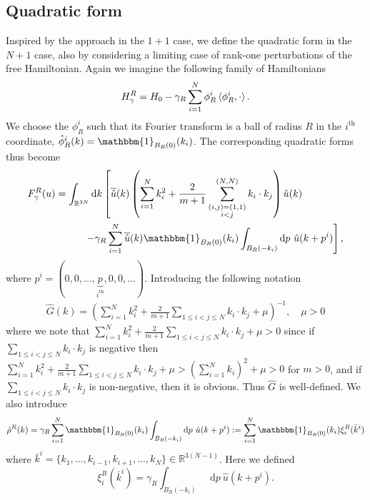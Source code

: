 \documentclass[a4paper,11pt]{article}
\newcommand*\diff{\mathop{}\!\mathrm{d}}
\newcommand{\R}{\mathbb{R}}
\numberwithin{equation}{section}
\begin{document}
\subsection{Quadratic form}
Inspired by the approach in the $ 1+1 $ case, we define the quadratic form in the $ N+1 $ case, also by considering a limiting case of rank-one perturbations of the free Hamiltonian. Again we imagine the following family of Hamiltonians\begin{equation}
H_\gamma^R=H_0-\gamma_R\sum_{i=1}^{N}\phi^i_R\braket{\phi^i_R,\cdot}.
\end{equation}
We choose the $ \phi^i_R $ such that its Fourier transform is a ball of radius $ R $ in the $ i^{\text{th}} $ coordinate, $ \hat{\phi}^i_R(k)=\mathbbm{1}_{B_R(0)}(k_i) $. The corresponding quadratic forms thus become\begin{equation}\label{F at Finite R}
\begin{aligned}
F_\gamma^R(u)=\int_{\R^{3N}}\diff k \left[\overline{\hat{u}}(k)\left(\sum_{i=1}^{N}k_i^2+\frac{2}{m+1}\sum_{\substack{(i,j)=(1,1)\\i<j}}^{(N,N)}k_i\cdot k_j\right)\hat{u}(k)\qquad\qquad\right.\\\left.-\gamma_R\sum_{i=1}^{N}\overline{\hat{u}}(k)\mathbbm{1}_{B_R(0)}(k_i)\int_{B_R(-k_i)}\diff p\ \hat{u}(k+p^i)\right],
\end{aligned}
\end{equation}
where $ p^i=(0,0,...,\underbrace{p}_{i^\text{th}},0,0,...) $. Introducing the following notation\begin{equation}
\begin{aligned}
\hat{G}(k)=\left(\sum_{i=1}^{N}k_i^2+\frac{2}{m+1}\sum_{1\leq i<j\leq N}k_i\cdot k_j+\mu\right)^{-1},\quad \mu>0
\end{aligned}
\end{equation}
where we note that $ \sum_{i=1}^{N}k_i^2+\frac{2}{m+1}\sum_{1\leq i<j\leq N}k_i\cdot k_j+\mu>0 $ since if $ \sum_{1\leq i<j\leq N}k_i\cdot k_j $ is negative then $ \sum_{i=1}^{N}k_i^2+\frac{2}{m+1}\sum_{1\leq i<j\leq N}k_i\cdot k_j+\mu>(\sum_{i=1}^{N}k_i)^2+\mu>0 $ for $ m>0 $, and if $ \sum_{1\leq i<j\leq N}k_i\cdot k_j $ is non-negative, then it is obvious. Thus $ \hat{G} $ is well-defined. We also introduce \begin{equation}
\hat{\rho}^R(k)=\gamma_R\sum_{i=1}^{N}\mathbbm{1}_{B_R(0)}(k_i)\int_{B_R(-k_i)}\diff p\ \hat{u}(k+p^i):=\sum_{i=1}^{N}\mathbbm{1}_{B_R(0)}(k_i)\xi_i^R(\bar{k}^i)
\end{equation}
where $ \bar{k}^i=\{k_1,...,k_{i-1},k_{i+1},...,k_N\}\in\R^{3(N-1)} $. Here we defined \begin{equation}
\xi^R_i(\bar{k}^i)=\gamma_R\int_{B_R(-k_i)}\diff p\ \hat{u}(k+p^i).
\end{equation}
\end{document}
